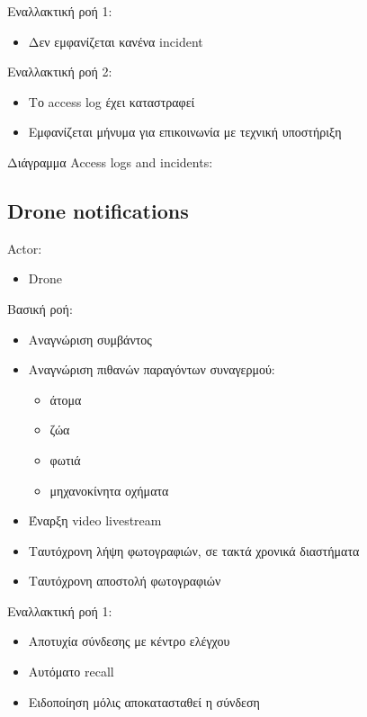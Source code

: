 \documentclass{article}
\begin{document}
\noindent Εναλλακτική ροή 1:
\begin{itemize}
    \item Δεν εμφανίζεται κανένα incident
\end{itemize}

\noindent Εναλλακτική ροή 2:
\begin{itemize}
    \item Το access log έχει καταστραφεί
    \item Εμφανίζεται μήνυμα για επικοινωνία με τεχνική υποστήριξη
\end{itemize}

\newpage
\noindent Διάγραμμα Access logs and incidents: \\
\noindent{}
\newpage

\subsection{Drone notifications}

\noindent Actor:
\begin{itemize}
    \item Drone
\end{itemize}

\noindent Βασική ροή:
\begin{itemize}
    \item Αναγνώριση συμβάντος
    \item Αναγνώριση πιθανών παραγόντων συναγερμού:
    \begin{itemize}
        \item άτομα
        \item ζώα 
        \item φωτιά
        \item μηχανοκίνητα οχήματα
    \end{itemize}
    \item Έναρξη video livestream 
    \item Ταυτόχρονη λήψη φωτογραφιών, σε τακτά χρονικά διαστήματα
    \item Ταυτόχρονη αποστολή φωτογραφιών
\end{itemize}

\noindent Εναλλακτική ροή 1:
\begin{itemize}
    \item Αποτυχία σύνδεσης με κέντρο ελέγχου
    \item Αυτόματο recall
    \item Ειδοποίηση μόλις αποκατασταθεί η σύνδεση
\end{itemize}
\end{document}

